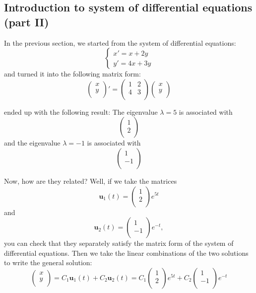 \documentclass[12pt]{report}
\begin{document}
\subsection*{Introduction to system of differential equations (part II)}
In the previous section, we started from the system of differential equations:
$$\begin{cases} x'=x+2y \\ y'=4x+3y \end{cases}$$
and turned it into the following matrix form:
$$\begin{pmatrix} x \\ y \\ \end{pmatrix}' = \begin{pmatrix} 1 & 2 \\ 4 & 3 \\ \end{pmatrix}  \begin{pmatrix} x \\ y \\ \end{pmatrix} $$

ended up with the following result:
The eigenvalue $\lambda = 5 $ is associated with
$$\begin{pmatrix} 1 \\ 2 \\ \end{pmatrix} $$
and the eigenvalue $\lambda = -1 $ is associated with
$$\begin{pmatrix} 1 \\ -1 \\ \end{pmatrix} $$

Now, how are they related?
Well, if we take the matrices
$$\mathbf{u}_1(t) = \begin{pmatrix} 1 \\ 2 \\ \end{pmatrix} e^{5t}$$
and
$$\mathbf{u}_2(t) = \begin{pmatrix} 1 \\ -1 \\ \end{pmatrix} e^{-t},$$
you can check that they separately satisfy the matrix form of the system of differential equations.
Then we take the linear combinations of the two solutions to write the general solution:
$$\begin{pmatrix} x \\ y \\ \end{pmatrix}  = C_1 \mathbf{u}_1(t) + C_2 \mathbf{u}_2(t) = C_1 \begin{pmatrix} 1 \\ 2 \\ \end{pmatrix} e^{5t} + C_2 \begin{pmatrix} 1 \\ -1 \\ \end{pmatrix} e^{-t} $$
\end{document}
